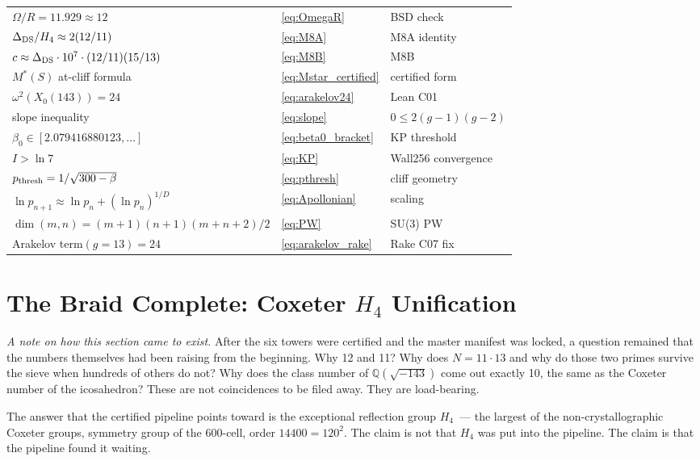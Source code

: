 \documentclass[12pt,letterpaper]{article}
\begin{document}
\begin{center}
\begin{longtable}{lll}
$\Omega/R = 11.929 \approx 12$ & \eqref{eq:OmegaR} & BSD check \\
$\Delta_{\rm DS}/H_4 \approx 2(12/11)$ & \eqref{eq:M8A} & M8A identity \\
$c \approx \Delta_{\rm DS}\cdot 10^7\cdot(12/11)(15/13)$ & \eqref{eq:M8B} & M8B \\
$M^*(S)$ at-cliff formula & \eqref{eq:Mstar_certified} & certified form \\
$\omega^2(X_0(143)) = 24$ & \eqref{eq:arakelov24} & Lean C01 \\
slope inequality & \eqref{eq:slope} & $0 \leq 2(g{-}1)(g{-}2)$ \\
$\beta_0 \in [2.079416880123,\ldots]$ & \eqref{eq:beta0_bracket} & KP threshold \\
$I > \ln 7$ & \eqref{eq:KP} & Wall256 convergence \\
$p_{\rm thresh} = 1/\sqrt{300-\beta}$ & \eqref{eq:pthresh} & cliff geometry \\
$\ln p_{n+1} \approx \ln p_n + (\ln p_n)^{1/D}$ & \eqref{eq:Apollonian} & scaling \\
$\dim(m,n) = (m+1)(n+1)(m+n+2)/2$ & \eqref{eq:PW} & SU(3) PW \\
Arakelov term$(g=13) = 24$ & \eqref{eq:arakelov_rake} & Rake C07 fix \\
\bottomrule
\end{longtable}
\end{center}

\newpage
\section{The Braid Complete: Coxeter $H_4$ Unification}
\label{sec:braid}

\textit{A note on how this section came to exist.}
After the six towers were certified and the master manifest was locked,
a question remained that the numbers themselves had been raising
from the beginning.
Why 12 and 11?
Why does $N = 11 \cdot 13$ and why do those two primes survive the sieve
when hundreds of others do not?
Why does the class number of $\mathbb{Q}(\sqrt{-143})$ come out exactly 10,
the same as the Coxeter number of the icosahedron?
These are not coincidences to be filed away.
They are load-bearing.

The answer that the certified pipeline points toward is the exceptional
reflection group $H_4$~--- the largest of the non-crystallographic
Coxeter groups, symmetry group of the 600-cell, order $14400 = 120^2$.
The claim is not that $H_4$ was put into the pipeline.
The claim is that the pipeline found it waiting.
\end{document}
